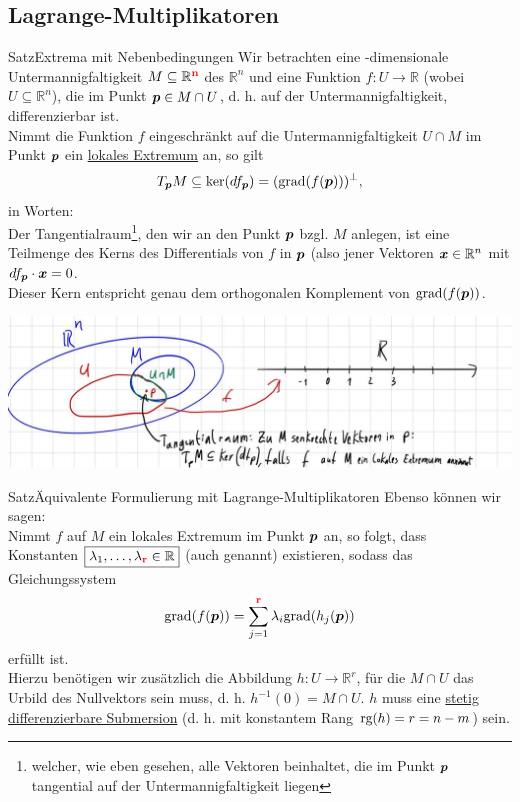 \subsection{Lagrange-Multiplikatoren}
\begin{Satz}
{Satz}{Extrema mit Nebenbedingungen}
Wir betrachten eine -dimensionale Untermannigfaltigkeit $M\subseteq\mathbb{R}^{\textcolor{red}{\textbf{n}}}$ des $\mathbb{R}^n$ und eine Funktion $f:U\to\mathbb{R}$ (wobei $U\subseteq\mathbb{R}^n$), die im Punkt ${{\text{\boldmath${p}$}}}\in M\cap U$, d. h. auf der Untermannigfaltigkeit, differenzierbar ist.\\
Nimmt die Funktion $f$ eingeschränkt auf die Untermannigfaltigkeit $U\cap M$ im Punkt ${{\text{\boldmath${p}$}}}$ ein \underline{lokales Extremum} an, so gilt
\begin{equation*}
    T_{{\text{\boldmath${p}$}}} M\subseteq\ker(df_{{\text{\boldmath${p}$}}})=(\text{grad}(f({{\text{\boldmath${p}$}}})))^\perp,
\end{equation*}
in Worten:\\
Der Tangentialraum\footnote{welcher, wie eben gesehen, alle Vektoren beinhaltet, die im Punkt ${{\text{\boldmath${p}$}}}$ tangential auf der Untermannigfaltigkeit liegen}, den wir an den Punkt ${{\text{\boldmath${p}$}}}$ bzgl. $M$ anlegen, ist eine Teilmenge des Kerns des Differentials von $f$ in ${{\text{\boldmath${p}$}}}$ (also jener Vektoren ${{\text{\boldmath${x}$}}}\in\mathbb{R}^n$ mit $df_{{\text{\boldmath${p}$}}}\cdot{{\text{\boldmath${x}$}}}=0$.\\
Dieser Kern entspricht genau dem orthogonalen Komplement von $\text{grad} (f({{\text{\boldmath${p}$}}}))$.
\begin{center}
    \includegraphics[width=.5\textwidth]{Dateien/10/10Lagrange1.jpg}
\end{center}
\end{Satz}
\begin{Satz}
{Satz}{Äquivalente Formulierung mit Lagrange-Multiplikatoren}
Ebenso können wir sagen:\\
Nimmt $f$ auf $M$ ein lokales Extremum im Punkt ${{\text{\boldmath${p}$}}}$ an, so folgt, dass\\
Konstanten $\boxed{\lambda_1,\ldots,\lambda_{\textcolor{red}{\textbf{r}}}\in\mathbb{R}}$ (auch  genannt) existieren, sodass das Gleichungssystem
\begin{equation*}
    \text{grad}(f({{\text{\boldmath${p}$}}}))=\sum_{j=1}^{\textcolor{red}{\textbf{r}}}\lambda_i\text{grad}(h_j({{\text{\boldmath${p}$}}}))
\end{equation*}
erfüllt ist.\\
Hierzu benötigen wir zusätzlich die Abbildung $h:U\to\mathbb{R}^r$, für die $M\cap U$ das Urbild des Nullvektors sein muss, d. h. $h^{-1}(0)=M\cap U$. $h$ muss eine \underline{stetig differenzierbare Submersion} (d. h. mit konstantem Rang $\text{rg}(h)=r=n-m$) sein.
\end{Satz}

